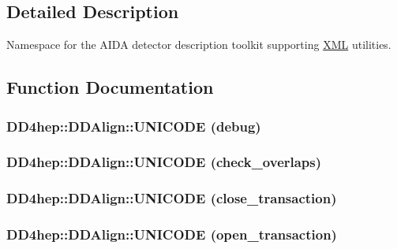 \subsection{Detailed Description}
Namespace for the AIDA detector description toolkit supporting \hyperlink{namespace_d_d4hep_1_1_x_m_l}{XML} utilities. 

\subsection{Function Documentation}
\hypertarget{namespace_d_d4hep_1_1_d_d_align_ae4e3eb8b7bab297efc0079f41e26d25f}{
\subsubsection[{UNICODE}]{\setlength{\rightskip}{0pt plus 5cm}DD4hep::DDAlign::UNICODE (debug)}}
\label{namespace_d_d4hep_1_1_d_d_align_ae4e3eb8b7bab297efc0079f41e26d25f}
\hypertarget{namespace_d_d4hep_1_1_d_d_align_aa5e5a3c901780b457658bd9825bb376a}{
\subsubsection[{UNICODE}]{\setlength{\rightskip}{0pt plus 5cm}DD4hep::DDAlign::UNICODE (check\_\-overlaps)}}
\label{namespace_d_d4hep_1_1_d_d_align_aa5e5a3c901780b457658bd9825bb376a}
\hypertarget{namespace_d_d4hep_1_1_d_d_align_ad8b81995e9e734f3de4f7b3fcc71b969}{
\subsubsection[{UNICODE}]{\setlength{\rightskip}{0pt plus 5cm}DD4hep::DDAlign::UNICODE (close\_\-transaction)}}
\label{namespace_d_d4hep_1_1_d_d_align_ad8b81995e9e734f3de4f7b3fcc71b969}
\hypertarget{namespace_d_d4hep_1_1_d_d_align_a3e55e7bb8f6ced963649271e80d38ef7}{
\subsubsection[{UNICODE}]{\setlength{\rightskip}{0pt plus 5cm}DD4hep::DDAlign::UNICODE (open\_\-transaction)}}
